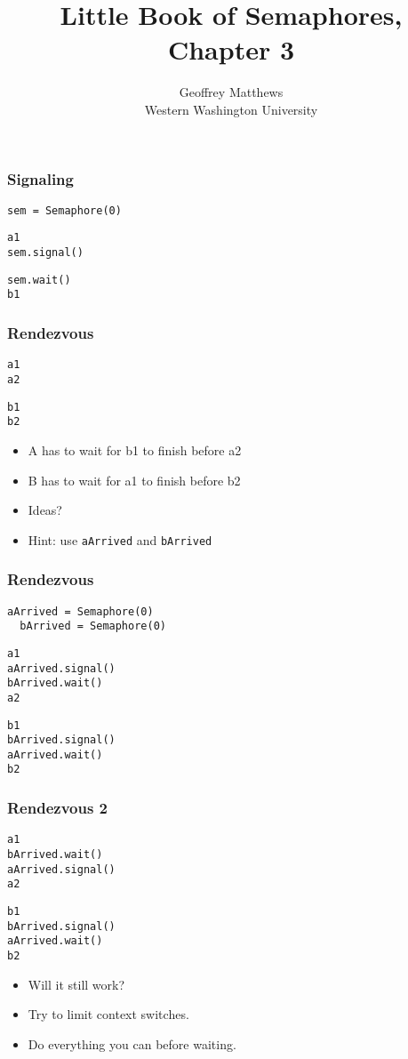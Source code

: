 \documentclass{beamer}
\title{Little Book of Semaphores, Chapter 3}
\author{Geoffrey Matthews\\
\small Western Washington University}
\newcommand{\bi}{\begin{itemize}}
\newcommand{\ii}{\item}
\newcommand{\ei}{\end{itemize}}
\newcommand{\bfr}[1]{\begin{frame}[fragile]\frametitle{{ #1 }}}
\begin{document}
\maketitle

\bfr{Signaling}
\begin{Verbatim}[label=Initialization]
sem = Semaphore(0)
\end{Verbatim}
\begin{multicols}{2}
\begin{Verbatim}[label=Thread A]
a1
sem.signal()
\end{Verbatim}
\begin{Verbatim}[label=Thread B]
sem.wait()
b1
\end{Verbatim}
\end{multicols}
\end{frame}

\bfr{Rendezvous}
\begin{multicols}{2}
\begin{Verbatim}[label=Thread A]
a1
a2
\end{Verbatim}
\begin{Verbatim}[label=Thread B]
b1
b2
\end{Verbatim}
\end{multicols}
\bi
\ii A has to wait for b1 to finish before a2
\ii B has to wait for a1 to finish before b2
\ii Ideas?
\pause
\ii Hint: use {\tt aArrived} and {\tt bArrived}
\ei
\end{frame}

\bfr{Rendezvous}
\begin{Verbatim}[label=Initialization]
  aArrived = Semaphore(0)
  bArrived = Semaphore(0)
\end{Verbatim}
\begin{multicols}{2}
\begin{Verbatim}[label=Thread A]
a1
aArrived.signal()
bArrived.wait()
a2
\end{Verbatim}
\begin{Verbatim}[label=Thread B]
b1
bArrived.signal()
aArrived.wait()
b2
\end{Verbatim}
\end{multicols}
\end{frame}

\bfr{Rendezvous 2}
\begin{multicols}{2}
\begin{Verbatim}[label=Thread A]
a1
bArrived.wait()
aArrived.signal()
a2
\end{Verbatim}
\begin{Verbatim}[label=Thread B]
b1
bArrived.signal()
aArrived.wait()
b2
\end{Verbatim}
\end{multicols}
\bi\ii Will it still work?
\pause
\ii Try to limit context switches.
\ii Do everything you can before waiting.
\ei
\end{frame}
\end{document}
